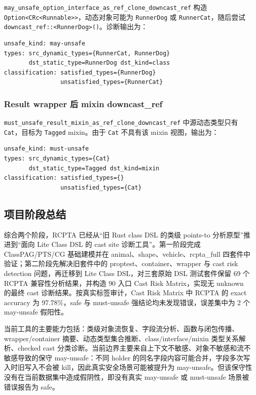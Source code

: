 \documentclass[10.5pt,compsoc,UTF8]{cjc}
\theoremstyle{mystyle}
\begin{document}
\texttt{may\_unsafe\_option\_interface\_as\_ref\_clone\_downcast\_ref} 构造 \texttt{Option<CRc<Runnable>>}，动态对象可能为 \texttt{RunnerDog} 或 \texttt{RunnerCat}，随后尝试 \texttt{downcast\_ref::<RunnerDog>()}。诊断输出为：

\begin{lstlisting}
unsafe_kind: may-unsafe
types: src_dynamic_types={RunnerCat, RunnerDog}
       dst_static_type=RunnerDog dst_kind=class
classification: satisfied_types={RunnerDog}
                unsatisfied_types={RunnerCat}
\end{lstlisting}

\subsubsection{Result wrapper 后 mixin downcast\_ref}

\texttt{must\_unsafe\_result\_mixin\_as\_ref\_clone\_downcast\_ref} 中源动态类型只有 \texttt{Cat}，目标为 \texttt{Tagged} mixin。由于 \texttt{Cat} 不具有该 mixin 视图，输出为：

\begin{lstlisting}
unsafe_kind: must-unsafe
types: src_dynamic_types={Cat}
       dst_static_type=Tagged dst_kind=mixin
classification: satisfied_types={}
                unsatisfied_types={Cat}
\end{lstlisting}

\subsection{项目阶段总结}

综合两个阶段，RCPTA 已经从“旧 Rust class DSL 的类级 points-to 分析原型”推进到“面向 Lite Class DSL 的 cast site 诊断工具”。第一阶段完成 ClassPAG/PTS/CG 基础建模并在 animal、shape、vehicle、rcpta\_full 四套件中验证；第二阶段先解决旧套件中的 proptest、container、wrapper 与 cast risk detection 问题，再迁移到 Lite Class DSL，对三套原始 DSL 测试套件保留 69 个 RCPTA 兼容性分析结果，并构造 90 入口 Cast Risk Matrix，实现无 unknown 的最终 cast 诊断结果。按真实标签审计，Cast Risk Matrix 中 RCPTA 的 exact accuracy 为 97.78\%，safe 与 must-unsafe 强结论均未发现错误，误差集中为 2 个 may-unsafe 假阳性。

当前工具的主要能力包括：类级对象流恢复、字段流分析、函数与闭包传播、wrapper/container 摘要、动态类型集合推断、class/interface/mixin 类型关系解析、checked cast 分类诊断。当前边界主要来自上下文不敏感、对象不敏感和流不敏感导致的保守 may-unsafe：不同 holder 的同名字段内容可能合并，字段多次写入时旧写入不会被 kill，因此真实安全场景可能被提升为 may-unsafe。但该保守性没有在当前数据集中造成假阴性，即没有真实 may-unsafe 或 must-unsafe 场景被错误报告为 safe。
\end{document}
